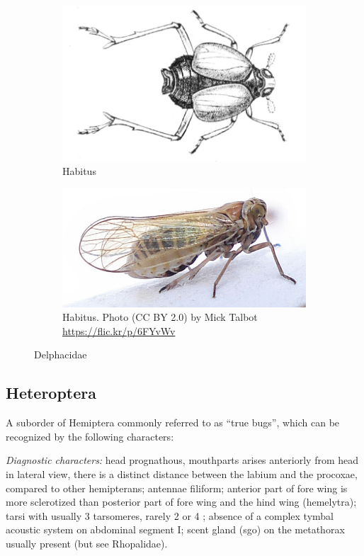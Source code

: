 \documentclass[letterpaper, 11pt]{article}
\begin{document}
\begin{figure}[ht!]
 \centering
 \begin{subfigure}[ht!]{0.4\textwidth}
  \includegraphics[width=\textwidth]{DelphacidHabitusInk}
  \caption{Habitus \citep[][Plate 7, Fig. 10]{bhl37902}}
  \label{fig:delphacid1}
 \end{subfigure}
 \qquad
 \begin{subfigure}[ht!]{0.45\textwidth}
  \includegraphics[width=\textwidth]{DelphacidHabitus}
  \caption{Habitus. Photo (CC BY 2.0) by Mick Talbot \url{https://flic.kr/p/6FYvWv}}
  \label{fig:delphacid2}
 \end{subfigure}
 \caption{Delphacidae}\label{fig:delphacids}
\end{figure}

\subsection{Heteroptera}
A suborder of Hemiptera commonly referred to as ``true bugs'', which can be recognized by the following characters:

\noindent{}\textit{Diagnostic characters:} head prognathous, mouthparts arises anteriorly from head
in lateral view, there is a distinct distance between the labium and the procoxae, compared to other hemipterans; antennae filiform; anterior part of fore wing is more sclerotized than posterior part of fore wing and the hind wing (hemelytra); tarsi with usually 3 tarsomeres, rarely 2 or 4 ; absence of a complex tymbal acoustic system on abdominal segment I; scent gland (sgo) on the metathorax usually present (but see Rhopalidae).\\
\end{document}
